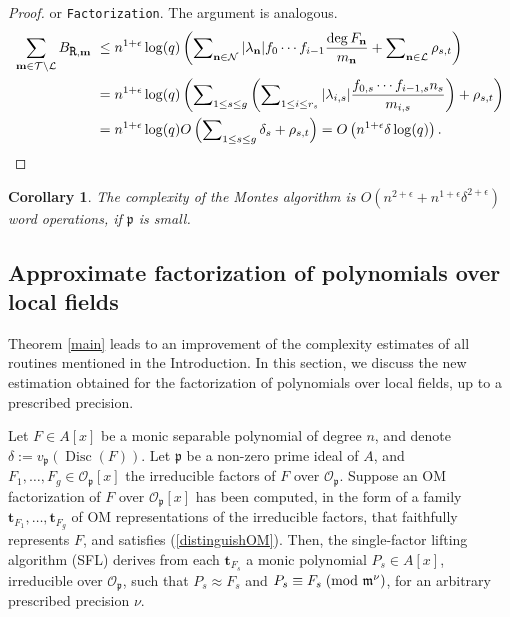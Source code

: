 \documentclass{amsart}
\newtheorem{corollary}[theorem]{Corollary}
\begin{document}
\begin{proof}
 or {\tt Factorization}. The argument is analogous.
\begin{align*}
\sum_{{\mathbf{m}} \in{\mathcal{T}}\setminus{\mathcal{L}}}B_{\mbox{\tt R},{\mathbf{m}}}&\ \le n^{1+\epsilon}\log(q)\left(\sum\nolimits_{{\mathbf{n}}\in{\mathcal{N}}}|\lambda_{\mathbf{n}}|f_0\cdots f_{i-1}\dfrac{\deg F_{\mathbf{n}}}{m_{\mathbf{n}}}+\sum\nolimits_{{\mathbf{n}}\in{\mathcal{L}}}\rho_{s,t}\right)\\
&\ =n^{1+\epsilon}\log(q)\left(\sum\nolimits_{1\le s\le g}\left(\sum\nolimits_{1\le i\le r_s} |\lambda_{i,s}| \dfrac{f_{0,s}\cdots f_{i-1,s}n_s}{m_{i,s}}\right)+\rho_{s,t}\right)\\
&\ =n^{1+\epsilon}\log(q)O\left(\sum\nolimits_{1\le s\le g}\delta_s+\rho_{s,t}\right)=O\left(n^{1+\epsilon}\delta\log(q)\right).
\end{align*}
\end{proof}

\begin{corollary}\label{psmall}
The complexity of the Montes algorithm is $O\left(n^{2+\epsilon}+n^{1+\epsilon}\delta^{2+\epsilon}\right)$ word operations, if ${\mathfrak{p}}$ is small. 
\end{corollary}

\subsection{Approximate factorization of polynomials over local fields}\label{subsecAppFactorization}
Theorem \ref{main} leads to an improvement of the complexity estimates of all routines mentioned in the Introduction. In this section, we discuss the new estimation obtained for the factorization of polynomials over local fields, up to a prescribed precision. 

Let  $F\in A[x]$ be a monic separable polynomial of degree $n$, and denote $\delta:=v_{\mathfrak{p}}({\operatorname{Disc}}(F))$. Let ${\mathfrak{p}}$ be a non-zero prime ideal of $A$, and $F_1,\dots,F_g\in{\mathcal{O}}_{\mathfrak{p}}[x]$ the irreducible factors of $F$ over ${\mathcal{O}}_{\mathfrak{p}}$. 
Suppose an OM factorization of $F$ over ${\mathcal{O}}_{\mathfrak{p}}[x]$ has been computed, in the form of a family ${\mathbf{t}}_{F_1},\dots,{\mathbf{t}}_{F_g}$ of OM representations of the irreducible factors, that faithfully represents $F$, and satisfies (\ref{distinguishOM}).
Then, the single-factor lifting algorithm (SFL) derives from each ${\mathbf{t}}_{F_s}$ a monic polynomial $P_s\in A[x]$, irreducible over ${\mathcal{O}}_{\mathfrak{p}}$, such that $P_s\approx F_s$ and $P_s\equiv F_s{\; \mbox{\rm(mod }{{{{\mathfrak m}}^\nu}})}$, for an arbitrary prescribed precision $\nu$. 
\end{document}
